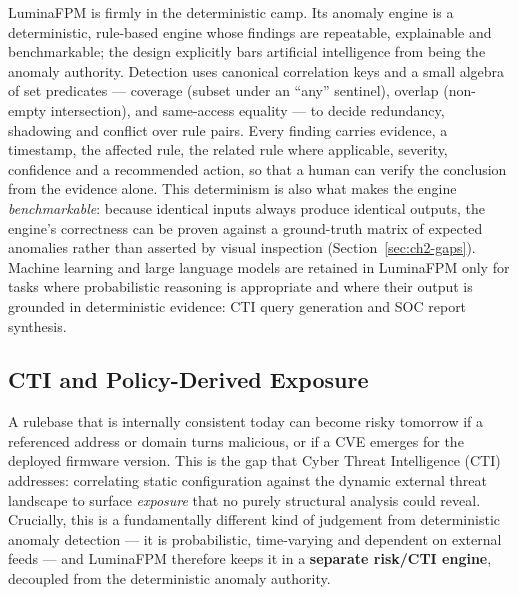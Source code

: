 \documentclass[12pt,a4paper]{report}
\renewcommand{\_}{\textunderscore\allowbreak}
\begin{document}
LuminaFPM is firmly in the deterministic camp. Its anomaly engine is a deterministic, rule-based engine whose findings are repeatable, explainable and benchmarkable; the design explicitly bars artificial intelligence from being the anomaly authority. Detection uses canonical correlation keys and a small algebra of set predicates --- coverage (subset under an ``any'' sentinel), overlap (non-empty intersection), and same-access equality --- to decide redundancy, shadowing and conflict over rule pairs. Every finding carries evidence, a timestamp, the affected rule, the related rule where applicable, severity, confidence and a recommended action, so that a human can verify the conclusion from the evidence alone. This determinism is also what makes the engine \emph{benchmarkable}: because identical inputs always produce identical outputs, the engine's correctness can be proven against a ground-truth matrix of expected anomalies rather than asserted by visual inspection (Section~\ref{sec:ch2-gaps}). Machine learning and large language models are retained in LuminaFPM only for tasks where probabilistic reasoning is appropriate and where their output is grounded in deterministic evidence: CTI query generation and SOC report synthesis.

\subsection{CTI and Policy-Derived Exposure}
A rulebase that is internally consistent today can become risky tomorrow if a referenced address or domain turns malicious, or if a CVE emerges for the deployed firmware version. This is the gap that Cyber Threat Intelligence (CTI) addresses: correlating static configuration against the dynamic external threat landscape to surface \emph{exposure} that no purely structural analysis could reveal. Crucially, this is a fundamentally different kind of judgement from deterministic anomaly detection --- it is probabilistic, time-varying and dependent on external feeds --- and LuminaFPM therefore keeps it in a \textbf{separate risk/CTI engine}, decoupled from the deterministic anomaly authority.
\end{document}
